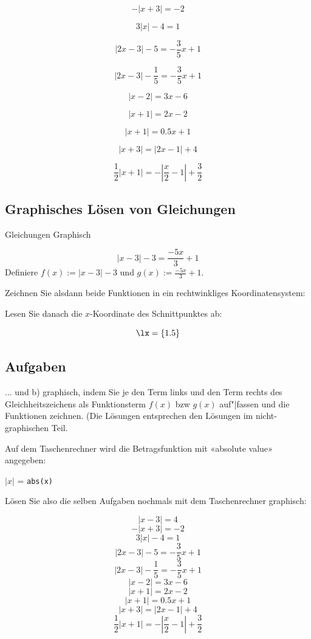 $$- |x+3 | = -2$$

$$3|x| - 4 = 1$$

$$|2x-3| - 5 =  -\frac{3}{5}x + 1$$

$$|2x-3| - \frac{1}{5} =  -\frac{3}{5}x + 1$$

\newpage

$$|x-2| =  3x-6$$


$$ |x+1|= 2x-2$$

$$ |x+1|= 0.5x+1$$

$$ |x+3| = |2x-1| + 4$$

$$ \frac{1}{2} \left| x+ 1\right| = - \left|\frac{x}{2} - 1\right| + \frac{3}{2} $$


\newpage
\subsection{Graphisches Lösen von Gleichungen}

\begin{beispiel}{Gleichungen Graphisch}{}

  $$|x-3| - 3 = \frac{-5x}{3} + 1$$
  Definiere
  $f(x) := |x-3|-3$
  und $g(x) := \frac{-5x}{3} + 1$.

  Zeichnen Sie alsdann beide Funktionen in ein rechtwinkliges
  Koordinatensystem:


  Lesen Sie danach die $x$-Koordinate des Schnittpunktes ab:
  
  $$\lx = \{1.5\}$$
\end{beispiel}
\newpage

\subsection*{Aufgaben}

... und b) graphisch, indem Sie je den Term
links und den Term rechts des Gleichheitszeichens als Funktionsterm
$f(x)$ bzw $g(x)$ auf"|fassen und die Funktionen zeichnen. (Die
Lösungen entsprechen den Lösungen im nicht-graphischen Teil.

Auf dem Taschenrechner wird die Betragsfunktion mit «absolute value» angegeben:

\begin{center}$|x|$ = \texttt{abs(x)} \end{center}

Lösen Sie also die selben Aufgaben nochmals mit dem Taschenrechner graphisch:

$$|x-3| = 4$$
$$- |x+3 | = -2$$
$$3|x| - 4 = 1$$
$$|2x-3| - 5 =  -\frac{3}{5}x + 1$$
$$|2x-3| - \frac{1}{5} =  -\frac{3}{5}x + 1$$
$$|x-2| =  3x-6$$
$$ |x+1|= 2x-2$$
$$ |x+1|= 0.5x+1$$
$$ |x+3| = |2x-1| + 4$$
$$ \frac{1}{2} | x+ 1| = - \left|\frac{x}{2} - 1\right| + \frac{3}{2} $$



